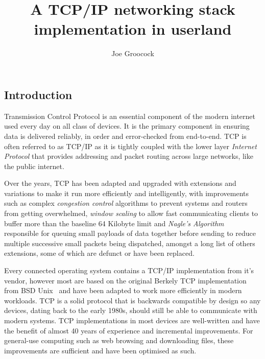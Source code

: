 \documentclass[11pt,a4paper,british]{bhamarticle}
\title{A TCP/IP networking stack implementation in userland}
\author{Joe Groocock}
\begin{document}

\maketitle

\begin{abstract}
\end{abstract}

\tableofcontents
\newpage

\begin{multicols}{2}

\section{Introduction}
Transmission Control Protocol is an essential component of the modern internet used every day on all class of devices. It is the primary component in ensuring data is delivered reliably, in order and error-checked from end-to-end. TCP is often referred to as TCP/IP as it is tightly coupled with the lower layer \textit{Internet Protocol} that provides addressing and packet routing across large networks, like the public internet.

Over the years, TCP has been adapted and upgraded with extensions and variations to make it run more efficiently and intelligently, with improvements such as complex \textit{congestion control} algorithms to prevent systems and routers from getting overwhelmed, \textit{window scaling} to allow fast communicating clients to buffer more than the baseline 64 Kilobyte limit and \textit{Nagle's Algorithm}~\cite{rfc896} responsible for queuing small payloads of data together before sending to reduce multiple successive small packets being dispatched, amongst a long list of others extensions, some of which are defunct or have been replaced.

Every connected operating system contains a TCP/IP implementation from it's vendor, however most are based on the original Berkely TCP implementation from BSD Unix~\cite{rfc793} and have been adapted to work more efficiently in modern workloads. TCP is a solid protocol that is backwards compatible by design so any devices, dating back to the early 1980s, should still be able to communicate with modern systems. TCP implementations in most devices are well-written and have the benefit of almost 40 years of experience and incremental improvements. For general-use computing such as web browsing and downloading files, these improvements are sufficient and have been optimised as such.


\end{multicols}
\end{document}
